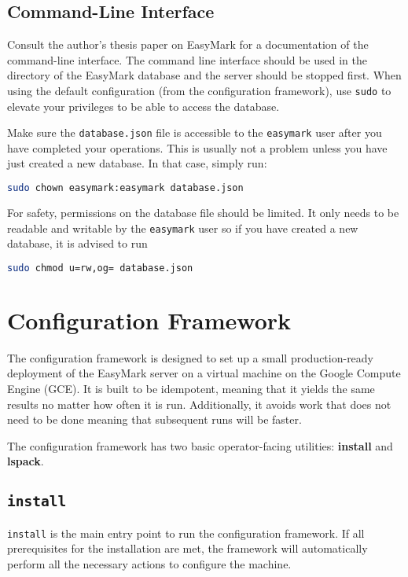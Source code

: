 \documentclass[12pt,a4paper]{report}
\begin{document}
	\section{Command-Line Interface}
	Consult the author's thesis paper on EasyMark for a documentation of the command-line interface. The command line interface should be used in the directory of the EasyMark database and the server should be stopped first. When using the default configuration (from the configuration framework), use \lstinline|sudo| to elevate your privileges to be able to access the database.
	
	Make sure the \lstinline|database.json| file is accessible to the \lstinline|easymark| user after you have completed your operations. This is usually not a problem unless you have just created a new database. In that case, simply run:
	
	\begin{lstlisting}[language=bash]
		sudo chown easymark:easymark database.json
	\end{lstlisting}
	
	For safety, permissions on the database file should be limited. It only needs to be readable and writable by the \lstinline|easymark| user so if you have created a new database, it is advised to run
	
	\begin{lstlisting}[language=bash]
		sudo chmod u=rw,og= database.json
	\end{lstlisting}

	\chapter{Configuration Framework}
	The configuration framework is designed to set up a small production-ready deployment of the EasyMark server on a virtual machine on the Google Compute Engine (GCE). It is built to be idempotent, meaning that it yields the same results no matter how often it is run. Additionally, it avoids work that does not need to be done meaning that subsequent runs will be faster.
	
	The configuration framework has two basic operator-facing utilities: \textbf{install} and \textbf{lspack}.
	
	\section{\lstinline|install|}
	\lstinline|install| is the main entry point to run the configuration framework. If all prerequisites for the installation are met, the framework will automatically perform all the necessary actions to configure the machine.
	
\end{document}
